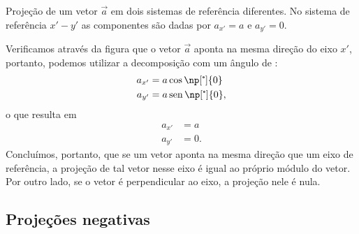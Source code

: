 \begin{marginfigure}[4cm]
\centering
{}
\caption{Projeção de um vetor $\vec{a}$ em dois sistemas de referência diferentes. No sistema de referência $x'-y'$ as componentes são dadas por $a_{x'} = a$ e $a_{y'} = 0$.\label{Fig:ProjCompleta}}
\end{marginfigure}

Verificamos através da figura que o vetor $\vec{a}$ aponta na mesma direção do eixo $x'$, portanto, podemos utilizar a decomposição com um ângulo de :
\begin{align}
    a_{x'} &= a \cos\np[\tcdegree]{0} \\
    a_{y'} &= a \sen\np[\tcdegree]{0},
\end{align}
%
o que resulta em
\begin{align}
    a_{x'} &= a \\
    a_{y'} &= 0.
\end{align}
%
Concluímos, portanto, que se um vetor aponta na mesma direção que um eixo de referência, a projeção de tal vetor nesse eixo é igual ao próprio módulo do vetor. Por outro lado, se o vetor é perpendicular ao eixo, a projeção nele é nula.

\subsection{Projeções negativas}

